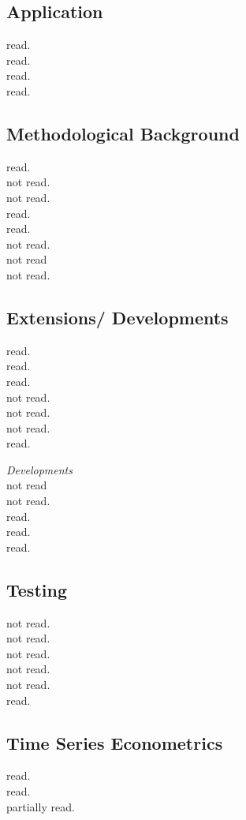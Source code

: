 \subsection{Application}
\cite{born:2019} read. \\
\cite{cho:2020} read.\\
\cite{cunningham:2021} read.\\
\cite{funke:2020} read.

\subsection{Methodological Background}
\cite{abadie:2011} read.\\
\cite{abadie:2006} not read.\\
\cite{abadie:2002} not read.\\
\cite{doudchenko:2016} read. \\
\cite{ferman:2021} read.\\
\cite{frangakis:2002} not read.\\
\cite{rosenbaum:1983} not read \\
\cite{rubin:1974} not read.

\subsection{Extensions/ Developments}
\cite{abadie:2019} read.\\
\cite{amjad:2018} read.\\
\cite{benmichael:2021a} read.\\
\cite{benmichael:2021b} not read. \\
\cite{kellog:2021} not read. \\
\cite{kuosmanen:2021} not read.\\
\cite{muhlbach:2019} read.

\textit{Developments}\\
\cite{arkhangelsky:2021} not read\\
\cite{athey:2017} not read.\\
\cite{brodersen:2015} read. \\
\cite{brzeski:2015} read. \\
\cite{hartford:2017} read.

\subsection{Testing}
\cite{andrews:2003} not read. \\
\cite{cattaneo:2021} not read. \\
\cite{chernozhukov:2019} not read.\\
\cite{chernozhukov:2021} not read. \\
\cite{firpo:2018} not read. \\
\cite{hahn:2017} read.

\subsection{Time Series Econometrics}
\cite{martin:2012} read.\\
\cite{harvey:2020} read.\\
\cite{breitung:2021} partially read.

